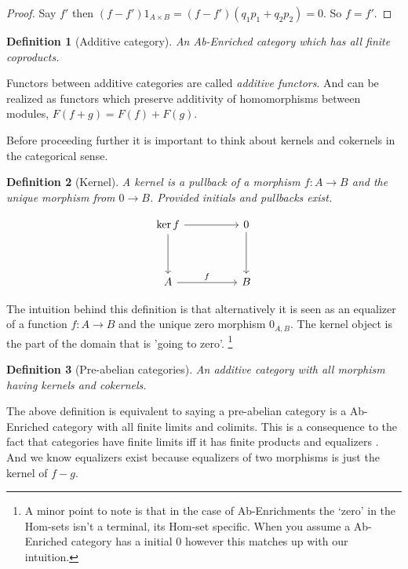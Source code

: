 \documentclass[12pt]{article}
\numberwithin{equation}{section}
\newtheorem{definition}{Definition}[section]
\begin{document}
\begin{appendices}
\begin{proof}
			Say $f'$ then $(f-f')1_{A \times B}=(f-f')(q_1p_1+q_2p_2)=0$. So $f=f'$.
			
			
		\end{proof}
		
		
		\begin{definition}[Additive category]
			An Ab-Enriched category which has all finite coproducts.
		\end{definition}
		
		Functors between additive categories are called \textit{additive functors}. And can be realized as functors which preserve additivity of homomorphisms between modules, $F(f+g)=F(f)+F(g).$
		
		Before proceeding further it is important to think about kernels and cokernels in the categorical sense.
		\begin{definition}[Kernel]
			A kernel is a pullback of a morphism $f:A \to B$ and the unique morphism from $0 \to B$. Provided initials and pullbacks exist.
			
			\[\begin{tikzcd}
				{\ker f} && 0 \\
				\\
				A && B
				\arrow["f", from=3-1, to=3-3]
				\arrow[from=1-3, to=3-3]
				\arrow[from=1-1, to=1-3]
				\arrow[from=1-1, to=3-1]
			\end{tikzcd}\]
		\end{definition}
		The intuition behind this definition is that alternatively it is seen as an equalizer of a function $f:A \to B$ and the unique zero morphism $0_{A,B}$. The kernel object is the part of the domain that is 'going to zero'. \footnote{A minor point to note is that in the case of Ab-Enrichments the `zero' in the Hom-sets isn't a terminal, its Hom-set specific. When you assume a Ab-Enriched category has a initial 0 however this matches up with our intuition.}
		
		
		\begin{definition}[Pre-abelian categories]
			An additive category with all morphism having kernels and cokernels.
		\end{definition}
		The above definition is equivalent to saying a pre-abelian category is a Ab-Enriched category with all finite limits and colimits. This is a consequence to the fact that categories have finite limits iff it has finite products and equalizers \cite[Prop.~5.21]{Awodey}. And we know equalizers exist because equalizers of two morphisms is just the kernel of $f-g$.
		
		
		

\end{appendices}
\end{document}
